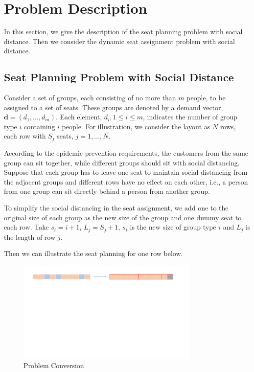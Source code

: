 \section{Problem Description}
In this section, we give the description of the seat planning problem with social distance. Then we consider the dynamic seat assignment problem with social distance.


\subsection{Seat Planning Problem with Social Distance}

Consider a set of groups, each consisting of no more than $m$ people, to be assigned to a set of seats. These groups are denoted by a demand vector, $\mathbf{d} = (d_1, \ldots, d_m)$. Each element, $d_i, 1 \leq i \leq m$, indicates the number of group type $i$ containing $i$ people. For illustration, we consider the layout as $N$ rows, each row with $S_{j}$ seats, $j = 1, \ldots, N$. 


According to the epidemic prevention requirements, the customers from the same group can sit together, while different groups should sit with social distancing. 
Suppose that each group has to leave one seat to maintain social distancing from the adjacent groups and different rows have no effect on each other, i.e., a person from one group can sit directly behind a person from another group.

To simplify the social distancing in the seat assignment, we add one to the original size of each group as the new size of the group and one dummy seat to each row. Take $s_{i} = i + 1$, $L_{j} = S_{j} +1$, $s_{i}$ is the new size of group type $i$ and $L_{j}$ is the length of row $j$.

Then we can illustrate the seat planning for one row below. 

\begin{figure}[ht]
    \centering
    \includegraphics[width = 0.8\textwidth]{./Figures/dummy_seat.pdf}
    \caption{Problem Conversion}
\end{figure}

